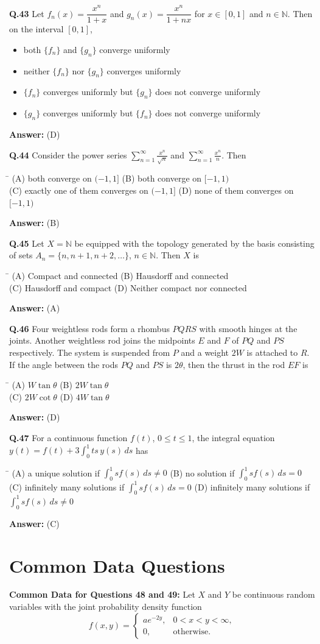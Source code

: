 \documentclass[11pt,a4paper]{article}
\newcommand{\optsfourA}[4]{%
  \begin{tabbing}
    \hspace{0.48\linewidth}\=\kill
    (A) #1 \> (B) #2 \\[2pt]
    (C) #3 \> (D) #4
  \end{tabbing}%
}
\newcommand{\optslistA}[4]{%
  \begin{itemize}
    \setlength{\itemsep}{2pt}\setlength{\parskip}{0pt}
    \item[(A)] #1
    \item[(B)] #2
    \item[(C)] #3
    \item[(D)] #4
  \end{itemize}%
}
\newcommand{\ans}[1]{\textbf{Answer:} #1\par\medskip}
\begin{document}
\textbf{Q.43} Let $f_n(x) = \dfrac{x^n}{1 + x}$ and $g_n(x) = \dfrac{x^n}{1 + nx}$ for $x \in [0, 1]$ and $n \in \mathbb{N}$. Then on the interval $[0, 1]$,
\optslistA{both $\{f_n\}$ and $\{g_n\}$ converge uniformly}{neither $\{f_n\}$ nor $\{g_n\}$ converges uniformly}{$\{f_n\}$ converges uniformly but $\{g_n\}$ does not converge uniformly}{$\{g_n\}$ converges uniformly but $\{f_n\}$ does not converge uniformly}
\ans{(D)}

\textbf{Q.44} Consider the power series $\displaystyle\sum_{n=1}^{\infty} \frac{x^n}{\sqrt{n}}$ and $\displaystyle\sum_{n=1}^{\infty} \frac{x^n}{n}$. Then
\optsfourA{both converge on $(-1, 1]$}{both converge on $[-1, 1)$}{exactly one of them converges on $(-1, 1]$}{none of them converges on $[-1, 1)$}
\ans{(B)}

\textbf{Q.45} Let $X = \mathbb{N}$ be equipped with the topology generated by the basis consisting of sets $A_n = \{n, n + 1, n + 2, \dots\}$, $n \in \mathbb{N}$. Then $X$ is
\optsfourA{Compact and connected}{Hausdorff and connected}{Hausdorff and compact}{Neither compact nor connected}
\ans{(A)}

\textbf{Q.46} Four weightless rods form a rhombus $PQRS$ with smooth hinges at the joints. Another weightless rod joins the midpoints $E$ and $F$ of $PQ$ and $PS$ respectively. The system is suspended from $P$ and a weight $2W$ is attached to $R$. If the angle between the rods $PQ$ and $PS$ is $2\theta$, then the thrust in the rod $EF$ is
\optsfourA{$W\tan\theta$}{$2W\tan\theta$}{$2W\cot\theta$}{$4W\tan\theta$}
\ans{(D)}

\textbf{Q.47} For a continuous function $f(t)$, $0 \le t \le 1$, the integral equation $y(t) = f(t) + 3\displaystyle\int_0^1 ts\,y(s)\,ds$ has
\optsfourA{a unique solution if $\displaystyle\int_0^1 s f(s)\,ds \ne 0$}{no solution if $\displaystyle\int_0^1 s f(s)\,ds = 0$}{infinitely many solutions if $\displaystyle\int_0^1 s f(s)\,ds = 0$}{infinitely many solutions if $\displaystyle\int_0^1 s f(s)\,ds \ne 0$}
\ans{(C)}

\section*{Common Data Questions}

\textbf{Common Data for Questions 48 and 49:}
Let $X$ and $Y$ be continuous random variables with the joint probability density function
\[
  f(x, y) = \begin{cases} a e^{-2y}, & 0 < x < y < \infty, \\ 0, & \text{otherwise.} \end{cases}
\]
\end{document}
